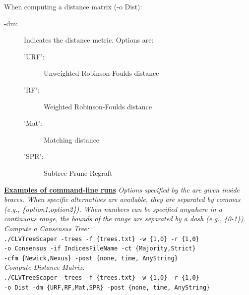 \documentclass[11pt]{article}
\begin{document}
\begin{enumerate}[{\bf (1)}]
\vspace{0.5cm}
	
When computing a distance matrix (-o Dist):
	\begin{description}
	\item[-dm:] Indicates the distance metric. Options are:
		\begin{description}
		\item['URF':] Unweighted Robinson-Foulds distance
		\item['RF':] Weighted Robinson-Foulds distance
		\item['Mat':] Matching distance
		\item['SPR':] Subtree-Prune-Regraft
		\end{description}
	\end{description} 

\vspace{0.5cm}




\ul{\bf Examples of command-line runs}
{\it Options specified by the are given inside braces. When specific alternatives are available, they
are separated by commas (e.g., \{option1,option2\}). When numbers can be specified anywhere in
a continuous range, the bounds of the range are separated by a dash (e.g., \{0-1\}).} \\




{\it Compute a Consensus Tree:} \\
{\tt ./CLVTreeScaper -trees -f \{trees.txt\} -w \{1,0\} -r \{1,0\}}\\
{\tt  -o Consensus -if IndicesFileName -ct \{Majority,Strict\} }\\
{\tt -cfm \{Newick,Nexus\} -post \{none, time, AnyString\}} \\


{\it Compute Distance Matrix:} \\
{\tt ./CLVTreeScaper -trees -f \{trees.txt\} -w \{1,0\} -r \{1,0\}}\\
{\tt  -o Dist -dm \{URF,RF,Mat,SPR\} -post \{none, time, AnyString\}} \\





\end{enumerate}
\end{document}
